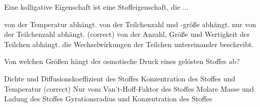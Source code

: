 \documentclass[11pt]{exam}
\begin{document}
\begin{questions}
\vspace{3mm}\question Eine kolligative Eigenschaft ist eine Stoffeigenschaft, die ...

\begin{choices}
	\choice von der Temperatur abhängt.
	\choice von der Teilchenzahl und -größe abhängt.
	\choice nur von der Teilchenzahl abhängt. (correct)
	\choice von der Anzahl, Größe und Wertigkeit der Teilchen abhängt.
	\choice die Wechselwirkungen der Teilchen untereinander beschreibt.
\end{choices}

\vspace{3mm}\question Von welchen Größen hängt der osmotische Druck eines gelösten Stoffes ab?

\begin{choices}
	\choice Dichte und Diffusionskoeffizient des Stoffes
	\choice Konzentration des Stoffes und Temperatur (correct)
	\choice Nur vom Van't-Hoff-Faktor des Stoffes
	\choice Molare Masse und Ladung des Stoffes
	\choice Gyrationsradius und Konzentration des Stoffes
\end{choices}

\vspace{3mm}\end{questions}
\end{document}
